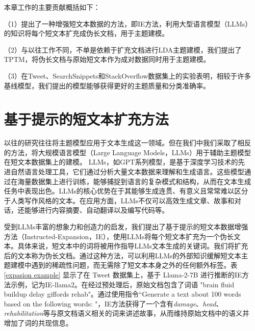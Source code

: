 本章工作的主要贡献概括如下：

（1）提出了一种增强短文本数据的方法，即IE方法，利用大型语言模型（LLMs）的知识将每个短文本扩充成伪长文档，用于主题建模。

（2）与以往工作不同，不单是依赖于扩充文档进行LDA主题建模，我们提出了TPTM，将伪长文档与原始短文本作为成对数据同时用于主题建模。

（3）在Tweet、SearchSnippets和StackOverflow数据集上的实验表明，相较于许多基线模型，我们提出的模型能够获得更好的主题质量和分类准确率。


\section{基于提示的短文本扩充方法}
以往的研究往往将主题模型应用于文本生成这一领域。但在我们中我们采取了相反的方法，将大规模语言模型（Large Language Models，LLMs）用于辅助主题模型在短文本数据集上的建模。
LLMs，如GPT系列模型，是基于深度学习技术的先进自然语言处理工具，它们通过分析大量文本数据来理解和生成语言。这些模型通过在海量数据集上进行训练，能够捕捉到语言的复杂模式和结构，从而在文本生成任务中表现出色。LLMs的核心优势在于其能够生成连贯、有意义且常常难以区分于人类写作风格的文本。在应用方面，LLMs不仅可以高效生成文章、故事和对话，还能够进行内容摘要、自动翻译以及编写代码等。

受到LLMs丰富的想象力和创造力的启发，我们提出了基于提示的短文本数据增强方法（Instructed-Expansion，IE），使用LLMs将每个短文本扩充为一个伪长文本。具体来说，短文本中的词将被用作指导LLMs文本生成的关键词。我们将扩充后的文本称为伪长文档。通过这种方法，可以利用LLMs的外部知识缓解短文本主题建模中遇到的稀疏性问题，而无需除了短文本本身之外的任何额外标签。表\ref{expasion example} 显示了在 Tweet 数据集上，基于 Llama-2-7B\cite{llama2} 进行推断的IE方法示例，记为IE-llama2。在经过预处理后，原始文档包含了词语 "brain fluid buildup delay giffords rehab"。通过使用指令“Generate a text about 100 words based on the following words: "，IE方法获得了一个含有\textit{damage}、\textit{head}、\textit{rehabilitation}等与原文档语义相关的词来讲述故事，从而维持原始文档中的语义并增加了词的共现信息。

